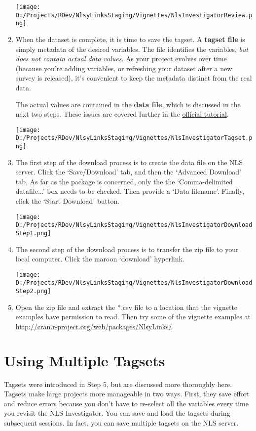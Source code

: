 \documentclass{article}\usepackage[]{graphicx}\usepackage[]{color}
\begin{document}
\begin{enumerate}
\texttt{[image: D:/Projects/RDev/NlsyLinksStaging/Vignettes/NlsInvestigatorReview.png]}

\item When the dataset is complete, it is time to save the tagset.  A \textbf{tagset file} is simply metadata of the desired variables.  The file identifies the variables, \emph{but does not contain actual data values}.  As your project evolves over time (because you're adding variables, or refreshing your dataset after a new survey is released), it's convenient to keep the metadata distinct from the real data.  

The actual values are contained in the \textbf{data file}, which is discussed in the next two steps.  These issues are covered further in the \href{http://www.nlsinfo.org/InvestigatorGuide/investigator_guide_TOC.html}{official tutorial}.

\texttt{[image: D:/Projects/RDev/NlsyLinksStaging/Vignettes/NlsInvestigatorTagset.png]}

\item The first step of the download process is to create the data file on the NLS server.  Click the `Save/Download' tab, and then the `Advanced Download' tab.  As far as the  package is concerned, only the the `Comma-delimited datafile...' box needs to be checked.  Then provide a `Data filename'.  Finally, click the `Start Download' button.

\texttt{[image: D:/Projects/RDev/NlsyLinksStaging/Vignettes/NlsInvestigatorDownloadStep1.png]}

\item The second step of the download process is to transfer the zip file to your local computer.  Click the maroon `download' hyperlink.

\texttt{[image: D:/Projects/RDev/NlsyLinksStaging/Vignettes/NlsInvestigatorDownloadStep2.png]}

\item Open the zip file and extract the *.csv file to a location that the vignette examples have permission to read.  Then try some of the  vignette examples at \url{http://cran.r-project.org/web/packages/NlsyLinks/}. 

\end{enumerate}
\section{Using Multiple Tagsets}
Tagsets were introduced in Step 5, but are discussed more thoroughly here.  Tagsets make large projects more manageable in two ways.  First, they save effort and reduce errors because you don't have to re-select all the variables every time you revisit the NLS Investigator.  You can save and load the tagsets during subsequent sessions.  In fact, you can save multiple tagsets on the NLS server.
\end{document}
